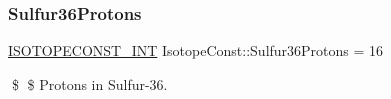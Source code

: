 \subsubsection{\texorpdfstring{Sulfur36\+Protons}{Sulfur36Protons}}
{\footnotesize\ttfamily \mbox{\hyperlink{group___isotope_const-_macros_ga5f18360b3e99483a35c32d789e62621c}{I\+S\+O\+T\+O\+P\+E\+C\+O\+N\+S\+T\+\_\+\+I\+NT}} Isotope\+Const\+::\+Sulfur36\+Protons = 16}

\$ \$ Protons in Sulfur-\/36. 